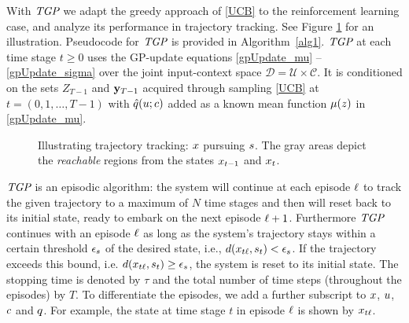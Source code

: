 With $\emph{TGP}$ we adapt the greedy approach of \eqref{UCB} to the reinforcement learning case, and analyze its performance in trajectory tracking. See Figure \ref{fig:drawing2} for an illustration. Pseudocode for $\emph{TGP}$ is provided in Algorithm~\ref{alg1}. $\emph{TGP}$ at each time stage $t\geq 0$ uses the GP-update equations \eqref{gpUpdate_mu} -- \eqref{gpUpdate_sigma} over the joint input-context space $\mathcal{D} = \mathcal{U} \times \mathcal{C}$. It is conditioned on the sets $Z_{T-1}$ and $\mathbf{y}_{T-1}$ acquired through sampling \eqref{UCB} at $t = (0,1,\ldots,T-1)$ with $\hat{q}(u;c)$ added as a known mean function $\mu(z)$ in \eqref{gpUpdate_mu}. 

\begin{figure}
	\centering
	\def\svgwidth{\columnwidth}
	
	\caption{Illustrating trajectory tracking: $x$ pursuing $s$. The gray areas depict the \emph{reachable} regions from the states $x_{t-1}$ and $x_{t}$.}
	\label{fig:drawing2}
\end{figure}

$\emph{TGP}$ is an episodic algorithm: the system will continue at each episode $\ell$ to track the given trajectory to a maximum of $N$ time stages and then will reset back to its initial state, ready to embark on the next episode $\ell + 1$. Furthermore $\emph{TGP}$ continues with an episode $\ell$ as long as the system's trajectory stays within a certain threshold $\epsilon_s$ of the desired state, i.e., $d(x_{t\ell},s_{t}) < \epsilon_s$. If the trajectory exceeds this bound, i.e. $d(x_{t\ell},s_{t}) \geq \epsilon_s$, the system is reset to its initial state. The stopping time is denoted by $\tau$ and the total number of time steps (throughout the episodes) by $T$. To differentiate the episodes, we add a further subscript to $x$, $u$, $c$ and $q$. For example, the state at time stage $t$ in episode $\ell$ is shown by $x_{t\ell}$.

